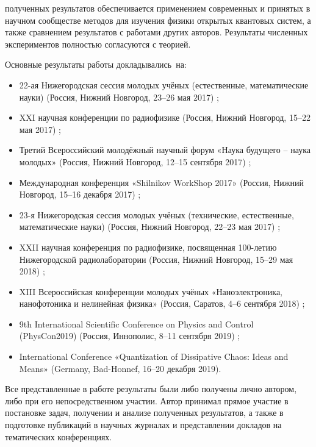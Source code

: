 {\reliability} полученных результатов обеспечивается применением современных и принятых в научном сообществе методов для изучения физики открытых квантовых систем, а также сравнением результатов с работами других авторов. 
Результаты численных экспериментов полностью согласуются с теорией.

{\probation}
Основные результаты работы докладывались~на:

\begin{itemize}
	\item 22-ая Нижегородская сессия молодых учёных (естественные, математические науки) (Россия, Нижний Новгород, 23--26 мая 2017) \cite{sessiann_2017};
	\item XXI научная конференции по радиофизике (Россия, Нижний Новгород, 15--22 мая 2017) \cite{rf_2017};
	\item Третий Всероссийский молодёжный научный форум «Наука будущего – наука молодых» (Россия, Нижний Новгород, 12--15 сентября 2017) \cite{sfy_2017};
	\item Международная конференция «Shilnikov WorkShop 2017» (Россия, Нижний Новгород, 15--16 декабря 2017) \cite{shilnikov_2017};
	\item 23-я Нижегородская сессия молодых учёных (технические, естественные, математические науки) (Россия, Нижний Новгород, 22--23 мая 2017) \cite{sessiann_2018};
	\item XXII научная конференция по радиофизике, посвященная 100-летию Нижегородской радиолаборатории (Россия, Нижний Новгород, 15--29 мая 2018) \cite{rf_2018};
	\item XIII Всероссийская конференции молодых учёных «Наноэлектроника, нанофотоника и нелинейная физика» (Россия, Саратов, 4--6 сентября 2018) \cite{nnnph_2018};
	\item 9th International Scientific Conference on Physics and Control (PhysCon2019) (Россия, Иннополис, 8--11 сентября 2019) \cite{physcon_2019};
	\item International Conference «Quantization of Dissipative Chaos: Ideas and Means» (Germany, Bad-Honnef, 16--20 декабря 2019).
\end{itemize}

{\contribution} Все представленные в работе результаты были либо
получены лично автором, либо при его непосредственном участии. Автор принимал прямое участие в постановке задач, получении и анализе полученных результатов, а также в подготовке публикаций в научных журналах и представлении докладов на тематических конференциях.

